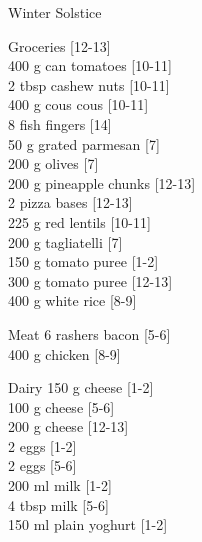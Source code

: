 \begin{menu}{Winter Solstice}
\begin{shoppinglist}{Groceries}
        {\scriptsize[12-13]}\\
      400 g can tomatoes 
        {\scriptsize[10-11]}\\
      2 tbsp cashew nuts 
        {\scriptsize[10-11]}\\
      400 g cous cous 
        {\scriptsize[10-11]}\\
      8  fish fingers 
        {\scriptsize[14]}\\
      50 g grated parmesan 
        {\scriptsize[7]}\\
      200 g olives 
        {\scriptsize[7]}\\
      200 g pineapple chunks 
        {\scriptsize[12-13]}\\
      2  pizza bases 
        {\scriptsize[12-13]}\\
      225 g red lentils 
        {\scriptsize[10-11]}\\
      200 g tagliatelli 
        {\scriptsize[7]}\\
      150 g tomato puree 
        {\scriptsize[1-2]}\\
      300 g tomato puree 
        {\scriptsize[12-13]}\\
      400 g white rice 
        {\scriptsize[8-9]}\\
      \end{shoppinglist}%
      \par\vfil %
      \begin{shoppinglist}{Meat}
      6 rashers bacon 
        {\scriptsize[5-6]}\\
      400 g chicken 
        {\scriptsize[8-9]}\\
      \end{shoppinglist}%
      \begin{shoppinglist}{Dairy}
      150 g cheese 
        {\scriptsize[1-2]}\\
      100 g cheese 
        {\scriptsize[5-6]}\\
      200 g cheese 
        {\scriptsize[12-13]}\\
      2  eggs 
        {\scriptsize[1-2]}\\
      2  eggs 
        {\scriptsize[5-6]}\\
      200 ml milk 
        {\scriptsize[1-2]}\\
      4 tbsp milk 
        {\scriptsize[5-6]}\\
      150 ml plain yoghurt 
        {\scriptsize[1-2]}\\
      \end{shoppinglist}%

\end{menu}
